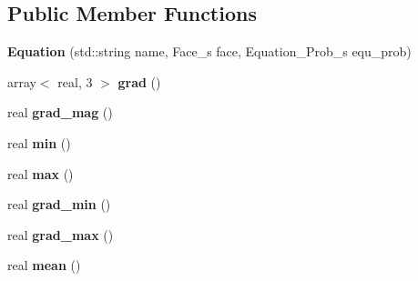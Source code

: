 \subsection*{Public Member Functions}
\begin{DoxyCompactItemize}
\item 
\hypertarget{classEquation_aa828f4c9f7a849e9ae29f2c9491863d6}{
{\bfseries Equation} (std::string name, Face\_\-s face, Equation\_\-Prob\_\-s equ\_\-prob)}
\label{classEquation_aa828f4c9f7a849e9ae29f2c9491863d6}

\item 
\hypertarget{classEquation_acda03fc82a1a28ab32f127754bf37aea}{
array$<$ real, 3 $>$ {\bfseries grad} ()}
\label{classEquation_acda03fc82a1a28ab32f127754bf37aea}

\item 
\hypertarget{classEquation_ab67fb5e35d95e74756aed668b072c03f}{
real {\bfseries grad\_\-mag} ()}
\label{classEquation_ab67fb5e35d95e74756aed668b072c03f}

\item 
\hypertarget{classEquation_a629f1ff3c54e7fcfe597c20ab49c773b}{
real {\bfseries min} ()}
\label{classEquation_a629f1ff3c54e7fcfe597c20ab49c773b}

\item 
\hypertarget{classEquation_a1e95e7d54591e5dc5c68ccca547101c5}{
real {\bfseries max} ()}
\label{classEquation_a1e95e7d54591e5dc5c68ccca547101c5}

\item 
\hypertarget{classEquation_a3a22bc1a6dd067b6feaf6fc6281a5c1f}{
real {\bfseries grad\_\-min} ()}
\label{classEquation_a3a22bc1a6dd067b6feaf6fc6281a5c1f}

\item 
\hypertarget{classEquation_ae2b284533eda56200c9122846623eb45}{
real {\bfseries grad\_\-max} ()}
\label{classEquation_ae2b284533eda56200c9122846623eb45}

\item 
\hypertarget{classEquation_ae0198edcc6a9a44ed7d88d8279f91cee}{
real {\bfseries mean} ()}
\label{classEquation_ae0198edcc6a9a44ed7d88d8279f91cee}

\end{DoxyCompactItemize}
